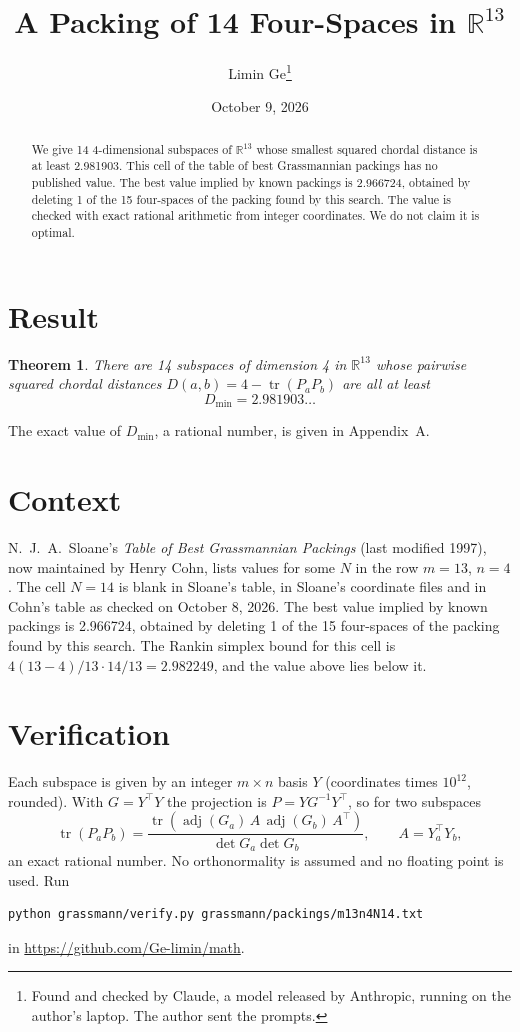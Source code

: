 \documentclass[11pt,a4paper]{article}
\title{A Packing of 14 Four-Spaces in $\mathbb{R}^{13}$}
\author{Limin Ge\thanks{Found and checked by Claude, a model released by Anthropic, running on the author's laptop. The author sent the prompts.}}
\date{October 9, 2026}
\newtheorem*{theorem}{Theorem}
\begin{document}
\maketitle
\begin{abstract}
We give 14 4-dimensional subspaces of $\mathbb{R}^{13}$ whose smallest squared chordal distance is at least 2.981903. This cell of the table of best Grassmannian packings has no published value. The best value implied by known packings is 2.966724, obtained by deleting 1 of the 15 four-spaces of the packing found by this search. The value is checked with exact rational arithmetic from integer coordinates. We do not claim it is optimal.
\end{abstract}

\section{Result}
\begin{theorem}
There are 14 subspaces of dimension 4 in $\mathbb{R}^{13}$ whose pairwise squared chordal distances $D(a,b) = 4 - \operatorname{tr}(P_aP_b)$ are all at least
\[ D_{\min} = 2.981903\ldots \]
\end{theorem}
The exact value of $D_{\min}$, a rational number, is given in Appendix~A.


\section{Context}
N.~J.~A.~Sloane's \emph{Table of Best Grassmannian Packings} (last modified 1997), now maintained by Henry Cohn, lists values for some $N$ in the row $m=13$, $n=4$. The cell $N=14$ is blank in Sloane's table, in Sloane's coordinate files and in Cohn's table as checked on October 8, 2026. The best value implied by known packings is 2.966724, obtained by deleting 1 of the 15 four-spaces of the packing found by this search. The Rankin simplex bound for this cell is $4(13-4)/13\cdot 14/13 = 2.982249$, and the value above lies below it.


\section{Verification}
Each subspace is given by an integer $m\times n$ basis $Y$ (coordinates times $10^{12}$, rounded). With $G=Y^\top Y$ the projection is $P=YG^{-1}Y^\top$, so for two subspaces
\[ \operatorname{tr}(P_aP_b)=\frac{\operatorname{tr}(\operatorname{adj}(G_a)\,A\,\operatorname{adj}(G_b)\,A^\top)}{\det G_a\det G_b},\qquad A=Y_a^\top Y_b, \]
an exact rational number. No orthonormality is assumed and no floating point is used. Run
\begin{verbatim}
python grassmann/verify.py grassmann/packings/m13n4N14.txt
\end{verbatim}
in \url{https://github.com/Ge-limin/math}.
\end{document}
